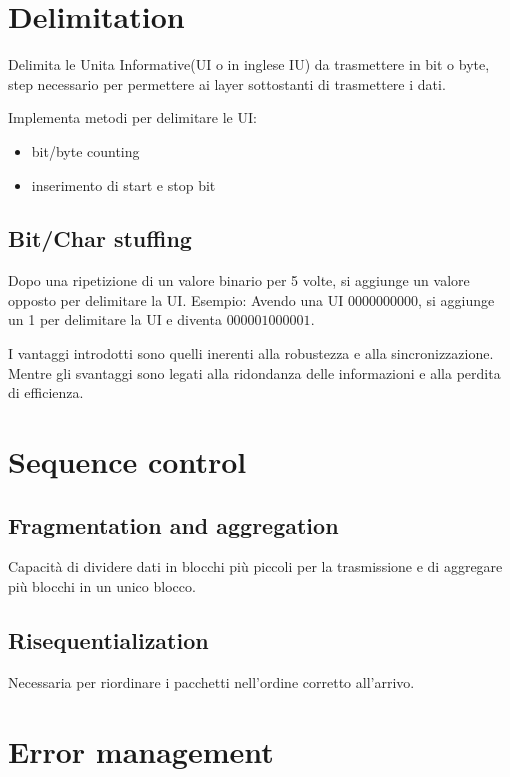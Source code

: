 \section{Delimitation}



Delimita le Unita Informative(UI o in inglese IU) da trasmettere in bit o byte, step necessario per permettere ai layer sottostanti di trasmettere i dati.

Implementa metodi per delimitare le UI:
\begin{itemize}
  \item bit/byte counting
  \item inserimento di start e stop bit
\end{itemize}

\subsection{Bit/Char stuffing}
Dopo una ripetizione di un valore binario per 5 volte, si aggiunge un valore opposto per delimitare la UI.
Esempio: Avendo una UI $0000000000$, si aggiunge un 1 per delimitare la UI e diventa $000001000001$.

I vantaggi introdotti sono quelli inerenti alla robustezza e alla sincronizzazione.
Mentre gli svantaggi sono legati alla ridondanza delle informazioni e alla perdita di efficienza.





\section{Sequence control}

\subsection{Fragmentation and aggregation}
Capacità di dividere dati in blocchi più piccoli per la trasmissione e di aggregare più blocchi in un unico blocco.


\subsection{Risequentialization}
Necessaria per riordinare i pacchetti nell'ordine corretto all'arrivo.



\section{Error management}

